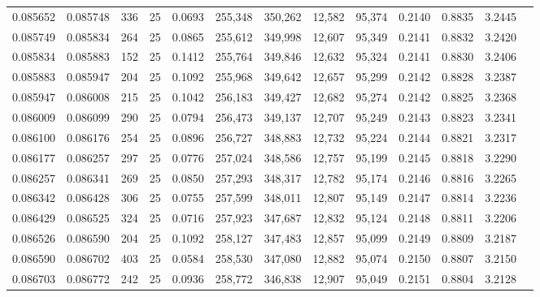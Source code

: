 \begin{tabular}{rrrrrrrrrrrrr}
0.085652 & 0.085748 &   336 &  25 &                                     0.0693 & 255,348 & 350,262 &  12,582 &  95,374 & 0.2140 & 0.8835 & 3.2445 \\
0.085749 & 0.085834 &   264 &  25 &                                     0.0865 & 255,612 & 349,998 &  12,607 &  95,349 & 0.2141 & 0.8832 & 3.2420 \\
0.085834 & 0.085883 &   152 &  25 &                                     0.1412 & 255,764 & 349,846 &  12,632 &  95,324 & 0.2141 & 0.8830 & 3.2406 \\
0.085883 & 0.085947 &   204 &  25 &                                     0.1092 & 255,968 & 349,642 &  12,657 &  95,299 & 0.2142 & 0.8828 & 3.2387 \\
0.085947 & 0.086008 &   215 &  25 &                                     0.1042 & 256,183 & 349,427 &  12,682 &  95,274 & 0.2142 & 0.8825 & 3.2368 \\
0.086009 & 0.086099 &   290 &  25 &                                     0.0794 & 256,473 & 349,137 &  12,707 &  95,249 & 0.2143 & 0.8823 & 3.2341 \\
0.086100 & 0.086176 &   254 &  25 &                                     0.0896 & 256,727 & 348,883 &  12,732 &  95,224 & 0.2144 & 0.8821 & 3.2317 \\
0.086177 & 0.086257 &   297 &  25 &                                     0.0776 & 257,024 & 348,586 &  12,757 &  95,199 & 0.2145 & 0.8818 & 3.2290 \\
0.086257 & 0.086341 &   269 &  25 &                                     0.0850 & 257,293 & 348,317 &  12,782 &  95,174 & 0.2146 & 0.8816 & 3.2265 \\
0.086342 & 0.086428 &   306 &  25 &                                     0.0755 & 257,599 & 348,011 &  12,807 &  95,149 & 0.2147 & 0.8814 & 3.2236 \\
0.086429 & 0.086525 &   324 &  25 &                                     0.0716 & 257,923 & 347,687 &  12,832 &  95,124 & 0.2148 & 0.8811 & 3.2206 \\
0.086526 & 0.086590 &   204 &  25 &                                     0.1092 & 258,127 & 347,483 &  12,857 &  95,099 & 0.2149 & 0.8809 & 3.2187 \\
0.086590 & 0.086702 &   403 &  25 &                                     0.0584 & 258,530 & 347,080 &  12,882 &  95,074 & 0.2150 & 0.8807 & 3.2150 \\
0.086703 & 0.086772 &   242 &  25 &                                     0.0936 & 258,772 & 346,838 &  12,907 &  95,049 & 0.2151 & 0.8804 & 3.2128 \\

\end{tabular}
